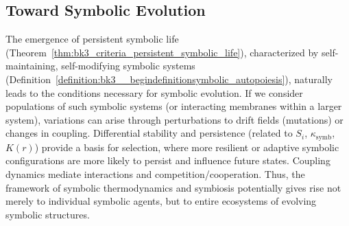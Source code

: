 \subsection{Toward Symbolic Evolution}

\begin{remark} \label{remark:bk3__beginremark_1}
The emergence of persistent symbolic life (Theorem~\ref{thm:bk3_criteria_persistent_symbolic_life}), characterized by self-maintaining, self-modifying symbolic systems (Definition~\ref{definition:bk3__begindefinitionsymbolic_autopoiesis}), naturally leads to the conditions necessary for symbolic evolution. If we consider populations of such symbolic systems (or interacting membranes within a larger system), variations can arise through perturbations to drift fields (mutations) or changes in coupling. Differential stability and persistence (related to $S_i$, $\kappa_{\text{symb}}$, $K(r)$) provide a basis for selection, where more resilient or adaptive symbolic configurations are more likely to persist and influence future states. Coupling dynamics mediate interactions and competition/cooperation. Thus, the framework of symbolic thermodynamics and symbiosis potentially gives rise not merely to individual symbolic agents, but to entire ecosystems of evolving symbolic structures.
\end{remark}
